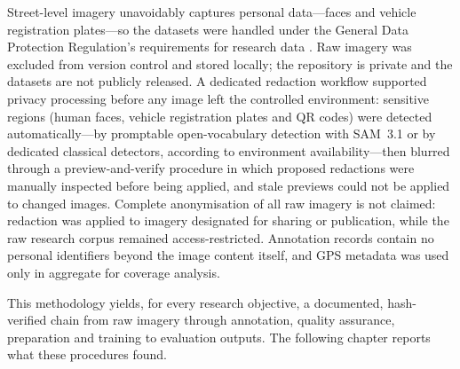 Street-level imagery unavoidably captures personal data---faces and vehicle registration plates---so the datasets were handled under the General Data Protection Regulation's requirements for research data \citep{gdpr2016}. Raw imagery was excluded from version control and stored locally; the repository is private and the datasets are not publicly released. A dedicated redaction workflow supported privacy processing before any image left the controlled environment: sensitive regions (human faces, vehicle registration plates and QR codes) were detected automatically---by promptable open-vocabulary detection with SAM~3.1 or by dedicated classical detectors, according to environment availability---then blurred through a preview-and-verify procedure in which proposed redactions were manually inspected before being applied, and stale previews could not be applied to changed images. Complete anonymisation of all raw imagery is not claimed: redaction was applied to imagery designated for sharing or publication, while the raw research corpus remained access-restricted. Annotation records contain no personal identifiers beyond the image content itself, and GPS metadata was used only in aggregate for coverage analysis.

This methodology yields, for every research objective, a documented, hash-verified chain from raw imagery through annotation, quality assurance, preparation and training to evaluation outputs. The following chapter reports what these procedures found.
